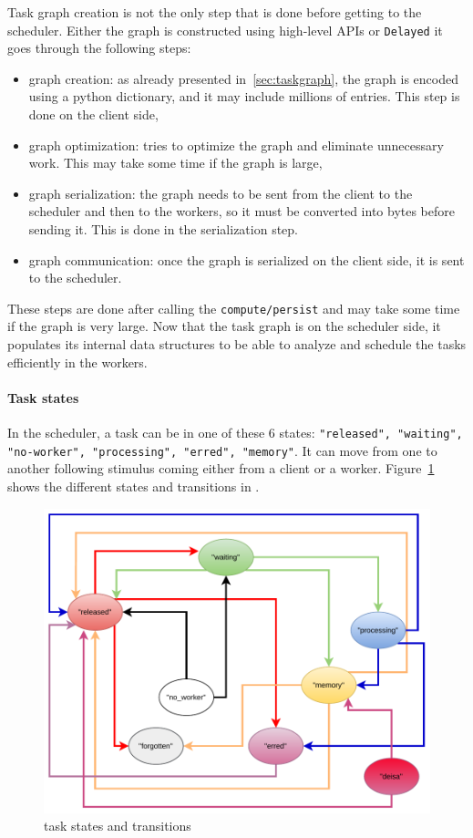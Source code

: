 Task graph creation is not the only step that is done before getting to the scheduler.
Either the graph is constructed using high-level APIs or \texttt{Delayed} it goes through the following steps:
\begin{itemize}
    \item graph creation: as already presented in~\ref{sec:taskgraph}, the graph is encoded using a python dictionary, and it may include millions of entries. This step is done on the client side, 
    \item graph optimization: \dask tries to optimize the graph and eliminate unnecessary work. This may take some time if the graph is large,
    \item graph serialization: the graph needs to be sent from the client to the scheduler and then to the workers, so it must be converted into bytes before sending it. This is done in the serialization step. 
    \item graph communication: once the graph is serialized on the client side, it is sent to the scheduler.
\end{itemize}
These steps are done after calling the \texttt{compute/persist} and may take some time if the graph is very large. 
Now that the task graph is on the scheduler side, it populates its internal data structures to be able to analyze and schedule the tasks efficiently in the workers.

\paragraph{Task states}
In the \dask scheduler, a task can be in one of these 6 states: \texttt{"released", "waiting", "no-worker", "processing", "erred", "memory"}. It can move from one to another following stimulus coming either from a client or a worker. Figure~\ref{figdasktaskstate} shows the different states and transitions in \dask. 

\begin{figure}[tb]\centering
\includegraphics[scale=0.8]{figures/TaskStatesSheduler.pdf}
\caption{\dask task states and transitions }
\label{figdasktaskstate}
\end{figure}

